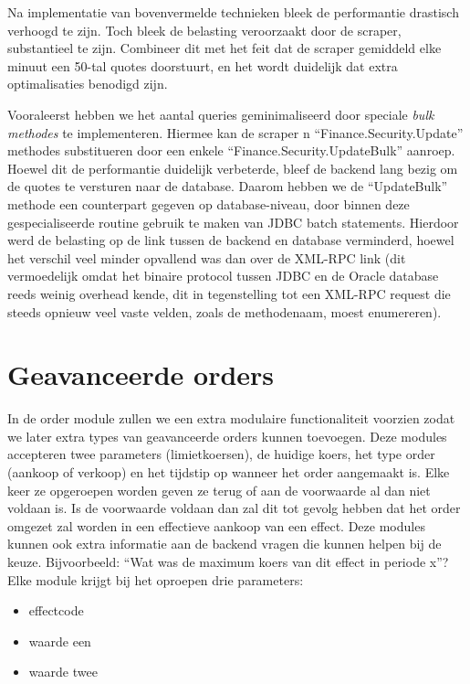 Na implementatie van bovenvermelde technieken bleek de performantie drastisch verhoogd te zijn. Toch bleek de belasting veroorzaakt door de scraper, substantieel te zijn. Combineer dit met het feit dat de scraper gemiddeld elke minuut een 50-tal quotes doorstuurt, en het wordt duidelijk dat extra optimalisaties benodigd zijn.

Vooraleerst hebben we het aantal queries geminimaliseerd door speciale \emph{bulk methodes} te implementeren. Hiermee kan de scraper n ``Finance.Security.Update'' methodes substitueren door een enkele ``Finance.Security.UpdateBulk'' aanroep. Hoewel dit de performantie duidelijk verbeterde, bleef de backend lang bezig om de quotes te versturen naar de database. Daarom hebben we de ``UpdateBulk'' methode een counterpart gegeven op database-niveau, door binnen deze gespecialiseerde routine gebruik te maken van JDBC batch statements. Hierdoor werd de belasting op de link tussen de backend en database verminderd, hoewel het verschil veel minder opvallend was dan over de XML-RPC link (dit vermoedelijk omdat het binaire protocol tussen JDBC en de Oracle database reeds weinig overhead kende, dit in tegenstelling tot een XML-RPC request die steeds opnieuw veel vaste velden, zoals de methodenaam, moest enumereren).



%
%

\chapter{Geavanceerde orders}
\label{chap:geavanceerde_orders}

In de order module zullen we een extra modulaire functionaliteit voorzien zodat we later extra types van geavanceerde orders kunnen toevoegen.
Deze modules accepteren twee parameters (limietkoersen), de huidige koers, het type order (aankoop of verkoop) en het tijdstip op wanneer het order aangemaakt is. Elke keer ze opgeroepen worden geven ze terug of aan de voorwaarde al dan niet voldaan is. Is de voorwaarde voldaan dan zal dit tot gevolg hebben dat het order omgezet zal worden in een effectieve aankoop van een effect.
Deze modules kunnen ook extra informatie aan de backend vragen die kunnen helpen bij de keuze. Bijvoorbeeld: ``Wat was de maximum koers van dit effect in periode x''?
Elke module krijgt bij het oproepen drie parameters:
\begin{itemize}
\item{effectcode}
\item{waarde een}
\item{waarde twee}
\end{itemize}

